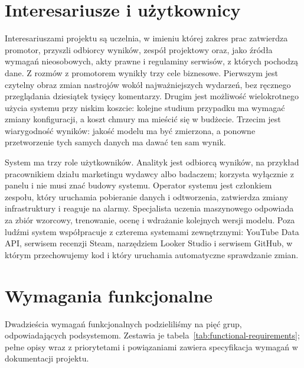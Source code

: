 \section{Interesariusze i użytkownicy}
\label{sec:req-users}

Interesariuszami projektu są uczelnia, w imieniu której zakres prac zatwierdza promotor, przyszli odbiorcy wyników, zespół projektowy oraz, jako źródła wymagań nieosobowych, akty prawne i regulaminy serwisów, z których pochodzą dane.
Z rozmów z promotorem wynikły trzy cele biznesowe.
Pierwszym jest czytelny obraz zmian nastrojów wokół najważniejszych wydarzeń, bez ręcznego przeglądania dziesiątek tysięcy komentarzy.
Drugim jest możliwość wielokrotnego użycia systemu przy niskim koszcie: kolejne studium przypadku ma wymagać zmiany konfiguracji, a koszt chmury ma mieścić się w budżecie.
Trzecim jest wiarygodność wyników: jakość modelu ma być zmierzona, a ponowne przetworzenie tych samych danych ma dawać ten sam wynik.

System ma trzy role użytkowników.
Analityk jest odbiorcą wyników, na przykład pracownikiem działu marketingu wydawcy albo badaczem; korzysta wyłącznie z panelu i nie musi znać budowy systemu.
Operator systemu jest członkiem zespołu, który uruchamia pobieranie danych i odtworzenia, zatwierdza zmiany infrastruktury i reaguje na alarmy.
Specjalista uczenia maszynowego odpowiada za zbiór wzorcowy, trenowanie, ocenę i wdrażanie kolejnych wersji modelu.
Poza ludźmi system współpracuje z czterema systemami zewnętrznymi: YouTube Data API, serwisem recenzji Steam, narzędziem Looker Studio i serwisem GitHub, w którym przechowujemy kod i który uruchamia automatyczne sprawdzanie zmian.

\section{Wymagania funkcjonalne}
\label{sec:req-functional}

Dwadzieścia wymagań funkcjonalnych podzieliliśmy na pięć grup, odpowiadających podsystemom.
Zestawia je tabela~\ref{tab:functional-requirements}; pełne opisy wraz z priorytetami i powiązaniami zawiera specyfikacja wymagań w dokumentacji projektu.

